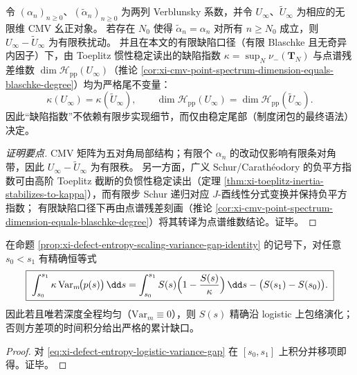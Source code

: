 \begin{proposition}\label{con:discussion-cmv-tail-invariant}
令 \((\alpha_n)_{n\ge 0}\)、\((\tilde\alpha_n)_{n\ge 0}\) 为两列 Verblunsky 系数，并令 \(U_\infty\)、\(\tilde U_\infty\) 为相应的无限维 CMV 幺正对象。
若存在 \(N_0\) 使得 \(\tilde\alpha_n=\alpha_n\) 对所有 \(n\ge N_0\) 成立，则 \(U_\infty-\tilde U_\infty\) 为有限秩扰动。
并且在本文的有限缺陷口径（有限 Blaschke 且无奇异内因子）下，由 Toeplitz 惯性稳定读出的缺陷指数
\(
\kappa=\sup_{N}\nu_-(\mathbf{T}_N)
\)
与点谱残差维数 \(\dim\mathcal H_{\mathrm{pp}}(U_\infty)\)（推论 \ref{cor:xi-cmv-point-spectrum-dimension-equals-blaschke-degree}）均为严格尾不变量：
\[
\boxed{\;
\kappa(U_\infty)=\kappa(\tilde U_\infty),
\qquad
\dim\mathcal H_{\mathrm{pp}}(U_\infty)=\dim\mathcal H_{\mathrm{pp}}(\tilde U_\infty).\;}
\]
因此“缺陷指数”不依赖有限步实现细节，而仅由稳定尾部（制度闭包的最终语法）决定。
\end{proposition}
\begin{proof}[证明要点]
CMV 矩阵为五对角局部结构；有限个 \(\alpha_n\) 的改动仅影响有限条对角带，因此 \(U_\infty-\tilde U_\infty\) 为有限秩。
另一方面，广义 Schur/Carath\'eodory 的负平方指数可由高阶 Toeplitz 截断的负惯性稳定读出（定理 \ref{thm:xi-toeplitz-inertia-stabilizes-to-kappa}），而有限步 Schur 递归对应 \(J\)-酉线性分式变换并保持负平方指数；
有限缺陷口径下再由点谱残差刻画（推论 \ref{cor:xi-cmv-point-spectrum-dimension-equals-blaschke-degree}）将其转译为点谱维数结论。证毕。
\end{proof}

\begin{corollary}\label{con:discussion-variance-gap-integral}
在命题 \ref{prop:xi-defect-entropy-scaling-variance-gap-identity} 的记号下，对任意 \(s_0<s_1\) 有精确恒等式
\[
\boxed{\;
\int_{s_0}^{s_1}\kappa\,\mathrm{Var}_{m}\!\bigl(p(s)\bigr)\,\dd s
=\int_{s_0}^{s_1}S(s)\Bigl(1-\frac{S(s)}{\kappa}\Bigr)\,\dd s-\bigl(S(s_1)-S(s_0)\bigr).\;}
\]
因此若且唯若深度全程均匀（\(\mathrm{Var}_m\equiv 0\)），则 \(S(s)\) 精确沿 logistic 上包络演化；否则方差项的时间积分给出严格的累计缺口。
\end{corollary}
\begin{proof}
对 \eqref{eq:xi-defect-entropy-logistic-variance-gap} 在 \([s_0,s_1]\) 上积分并移项即得。证毕。
\end{proof}

